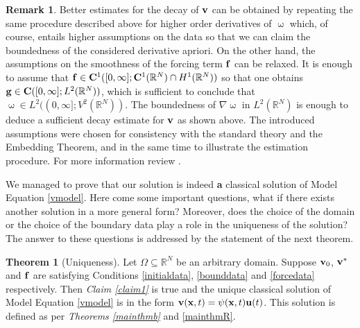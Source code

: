 \documentclass[a4 paper, 11pt,twoside]{article}
\newcommand{\Bf}[1]{{\bf{#1}}}
\newcommand{\V}{{\bf{v}}}
\newcommand{\X}{{\bf{x}}}
\newcommand{\0}{\Bf{0}}
\newcommand{\F}{{\bf{f}}}
\theoremstyle{definition}
\newtheorem*{rem}{Remark}
\newtheorem{theorem}{Theorem}
\begin{document}
\begin{rem}
Better estimates for the decay of $\V$ can be obtained by repeating the same procedure described above for higher order derivatives of $\upomega$ which, of course, entails higher assumptions on the data so that we can claim the boundedness of the considered derivative apriori. On the other hand, the assumptions on the smoothness of the forcing term $\F$ can be relaxed. It is enough to assume that $\F\in\Bf{C}^1([0,\infty];\Bf{C}^1(\mathbb{R}^N)\cap H^1(\mathbb{R}^N))$ so that one obtains $\Bf{g}\in\Bf{C}([0,\infty];L^2(\mathbb{R}^N))$, which is sufficient to conclude that $\upomega\in L^2((0,\infty];V^2(\mathbb{R}^N))$. The boundedness of $\nabla\upomega$ in $L^2(\mathbb{R}^N)$ is enough to deduce a sufficient decay estimate for $\V$ as shown above. The introduced assumptions were chosen for consistency with the standard theory and the Embedding Theorem, and in the same time to illustrate the estimation procedure. For more information review \cite[pp. 382-386]{evans}.
\end{rem}
We managed to prove that our solution is indeed {\Bf a} classical solution of Model Equation \eqref{vmodel}. Here come some important questions, what if there exists another solution in a more general form? Moreover, does the choice of the domain or the choice of the boundary data play a role in the uniqueness of the solution? The answer to these questions is addressed by the statement of the next theorem.
\begin{theorem}[Uniqueness]
Let $\Omega\subseteq\mathbb{R}^N$ be an arbitrary domain. Suppose $\V_0$, $\V^*$ and $\F$ are satisfying Conditions \eqref{initialdata}, \eqref{bounddata} and \eqref{forcedata} respectively. Then {\it Claim \ref{claim1}} is true and the unique classical solution of Model Equation \eqref{vmodel} is in the form $\V(\X,t)=\psi(\X,t)\Bf{u}(t)$. This solution is defined as per {\it Theorems \ref{mainthmb}} and \ref{mainthmR}.
\label{unique}
\end{theorem}
\end{document}
